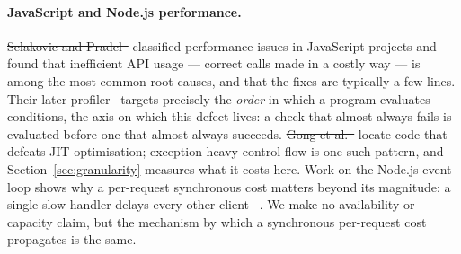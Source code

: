 \documentclass[pdflatex,sn-basic,twocolumn]{sn-jnl}%
\providecommand{\DIFdel}[1]{{\protect\color{red}\sout{#1}}}                      %
\providecommand{\DIFaddbegin}{} %
\providecommand{\DIFaddend}{} %
\providecommand{\DIFdelbegin}{} %
\providecommand{\DIFdelend}{} %
\newcommand{\DIFscaledelfig}{0.5}
\newlength{\DIFdelgraphicswidth} %
\newlength{\DIFdelgraphicsheight} %
\newcommand{\DIFaddincludegraphics}[2][]{{\color{blue}\fbox{\DIFOincludegraphics[#1]{#2}}}} %
\newcommand{\DIFdelincludegraphics}[2][]{%
\sbox{\DIFdelgraphicsbox}{\DIFOincludegraphics[#1]{#2}}%
\settoboxwidth{\DIFdelgraphicswidth}{\DIFdelgraphicsbox} %
\settoboxtotalheight{\DIFdelgraphicsheight}{\DIFdelgraphicsbox} %
\scalebox{\DIFscaledelfig}{%
\parbox[b]{\DIFdelgraphicswidth}{\usebox{\DIFdelgraphicsbox}\\[-\baselineskip] \rule{\DIFdelgraphicswidth}{0em}}\llap{\resizebox{\DIFdelgraphicswidth}{\DIFdelgraphicsheight}{%
\setlength{\unitlength}{\DIFdelgraphicswidth}%
\begin{picture}(1,1)%
\thicklines\linethickness{2pt} %
{\color[rgb]{1,0,0}\put(0,0){\framebox(1,1){}}}%
{\color[rgb]{1,0,0}\put(0,0){\line( 1,1){1}}}%
{\color[rgb]{1,0,0}\put(0,1){\line(1,-1){1}}}%
\end{picture}%
}\hspace*{3pt}}} %
} %
\DeclareRobustCommand{\DIFaddbegin}{\DIFOaddbegin \let\includegraphics\DIFaddincludegraphics} %
\DeclareRobustCommand{\DIFaddend}{\DIFOaddend \let\includegraphics\DIFOincludegraphics} %
\DeclareRobustCommand{\DIFdelbegin}{\DIFOdelbegin \let\includegraphics\DIFdelincludegraphics} %
\DeclareRobustCommand{\DIFdelend}{\DIFOaddend \let\includegraphics\DIFOincludegraphics} %
\begin{document}
\paragraph{JavaScript and Node.js performance.} \DIFdelbegin \DIFdel{Selakovic and
Pradel~}%
\DIFdelend \DIFaddbegin \citet{selakovic2016performance} \DIFaddend classified performance issues in
JavaScript projects and found that inefficient API usage --- correct calls made
in a costly way --- is among the most common root causes, and that the fixes
are typically a few lines. Their later profiler~\DIFdelbegin %
\DIFdelend \DIFaddbegin \citep{selakovic2017actionable}
\DIFaddend targets precisely the \emph{order} in which a program evaluates conditions, the
axis on which this defect lives: a check that almost always fails is evaluated
before one that almost always succeeds. \DIFdelbegin \DIFdel{Gong et al.~}%
\DIFdelend \DIFaddbegin \citet{gong2015jitprof}
\DIFaddend locate code that defeats JIT optimisation; exception-heavy control flow is one
such pattern, and Section~\ref{sec:granularity} measures what it costs here.
Work on the Node.js event loop shows why a per-request synchronous cost matters
beyond its magnitude: a single slow handler delays every other
client~\DIFdelbegin %
\DIFdelend \DIFaddbegin \citep{davis2018sense,staicu2018freezing}\DIFaddend . We make no availability or
capacity claim, but the mechanism by which a synchronous per-request cost
propagates is the same.
\end{document}
